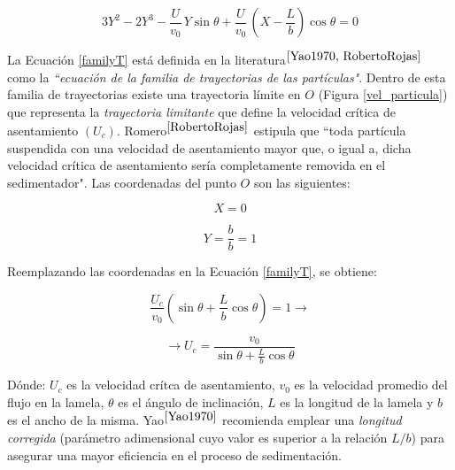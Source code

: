 \begin{equation}
	\boxed{3 Y ^2 - 2 Y ^3 - \frac{U}{v_0} \, Y \sin \theta + \frac{U}{v_0} \, \left(X- \frac{L}{b} \right) \cos \theta = 0}
	\label{familyT}
\end{equation}

\noindent
\justify

La Ecuaci\'on \ref{familyT} est\'a definida en la literatura$^{\cite{Yao1970, RobertoRojas}}$ como la \textit{``ecuaci\'on de la familia de trayectorias de las part\'iculas"}. Dentro de esta familia de trayectorias existe una trayectoria l\'imite en $O$ (Figura \ref{vel_particula}) que representa la \textit{trayectoria limitante} que define la velocidad cr\'itica de asentamiento $\left( U_ {c} \right)$. Romero$^{\cite{RobertoRojas}}$ estipula que ``toda part\'icula suspendida con una velocidad de asentamiento mayor que, o igual a, dicha velocidad cr\'itica de asentamiento ser\'ia completamente removida en el sedimentador". Las coordenadas del punto $O$ son las siguientes:

\begin{equation*}
	X = 0
\end{equation*}

\begin{equation*}
	Y = \frac{b}{b} = 1
\end{equation*}

\noindent
\justify

Reemplazando las coordenadas en la Ecuaci\'on \ref{familyT}, se obtiene:

\begin{equation*}
	\frac{U_{c}}{v_0} \left(\sin \theta + \frac{L}{b} \cos \theta \right) = 1 \rightarrow
\end{equation*}

\begin{equation}
	\rightarrow U_c = \frac{v_0}{\sin \theta + \frac{L}{b} \cos \theta}
	\label{Uc}
\end{equation}

\noindent
\justify

D\'onde: $U_c$ es la velocidad cr\'itca de asentamiento, $v_0$ es la velocidad promedio del flujo en la lamela, $\theta$ es el \'angulo de inclinaci\'on, $L$ es la longitud de la lamela y $b$ es el ancho de la misma. Yao$^{\cite{Yao1970}}$ recomienda emplear una \textit{longitud corregida} (par\'ametro adimensional cuyo valor es superior a la relaci\'on $L/b$) para asegurar una mayor eficiencia en el proceso de sedimentaci\'on.  


